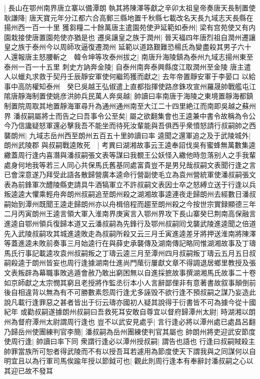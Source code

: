 |{
	長山在鄂州南界唐立寨以備潭朗}
執其將陳澤等獻之辛卯太祖皇帝奏唐天長制置使耿謙降|{
	唐天寶元年分江都六合高郵三縣地置千秋縣七載改名天長九域志天長縣在揚州西一百一十里}
獲芻糧二十餘萬唐主遣園苑使尹延範如泰州|{
	梁有宫苑使又有内園栽接使唐置園苑使亦猶是也}
遷吳讓皇之族于潤州|{
	晉天福四年唐烈祖自潤州遷讓皇之族于泰州今以周師攻逼復遷潤州}
延範以道路艱難恐楊氏為變盡殺其男子六十人還報唐主怒腰斬之　韓令坤等攻泰州拔之|{
	南唐升海陵鎮為泰州九域志揚州東至泰州一百一十五里}
刺史方訥奔金陵|{
	自泰州南奔泰興縣度江取潤州至金陵}
唐主遣人以蠟丸求救于契丹壬辰靜安軍使何繼筠獲而獻之|{
	去年帝置靜安軍于李晏口}
以給事中高防權知泰州　癸巳吳越王弘俶遣上直都指揮使路彦銖攻宣州羅晟帥戰艦屯江隂唐靜海制置使姚彦洪帥兵民萬人奔吳越|{
	帥讀曰率南唐于海陵之東境置靜海都鎮制置院周取其地置靜海軍尋升為通州通州南至大江二十四里絶江而南即吳越之蘇州界}
潘叔嗣屬將士而告之曰吾事令公至矣|{
	屬之欲翻集會也王逵兼中書令故稱為令公}
今乃信讒疑怒軍還必擊我吾不能坐而待死汝輩能與吾俱西乎衆憤怒請行叔嗣帥之西襲朗州|{
	九域志岳州西至朗州五百五十里帥讀曰率}
逵聞之還軍追之及于武陵城外|{
	朗州武陵郡}
與叔嗣戰逵敗死　|{
	考異曰湖湘故事云王逵奉詔伐吳有蜜蜂無萬數集逵繖蓋周行逢内喜潛與潘叔嗣張文表等謀曰我覩王公妖怪入繖他時忽落别人之手我輩處身何地我等若三人同心共保馬氏舊基同處富貴豈不是男兒哉叔嗣文表聞行逢之言已會深意遂乃拜受此語各散歸營廣本逵命行營副使毛立為袁州營統軍使潘叔嗣張文表為前鋒軍次醴陵縣吏請具牛酒犒軍立不許叔嗣文表因士卒之怒縛立送于行逢以兵叛逵逵大懼乘輕舟奔朗州叔嗣追至朗州殺之湖湘故事逵連夜走歸朗州去經數日潘叔嗣始到潭州既聞王逵走歸朗州亦以舟楫倍程而趨至朗州殺之今按世宗實録顯德三年二月丙寅朗州王逵言領大軍入淮南界庚寅言入鄂州界攻下長山寨癸巳荆南高保融言進逵自鄂州領兵復歸本道又云潘叔嗣為先鋒行及鄂州叔嗣囘戈襲武陵進逵聞之倍道先入武陵叔嗣攻其城進逵敗走為叔嗣所殺又云三月壬寅進逵差牙將押送淮南將陳澤等蓋進逵未敗前奏事三月始逵行在與薛史承襲傳及湖南傳記略同惟湖湘故事及丁璹馬氏行事記載逵攻袁州叔嗣叛之丁璹云逵三月至潭州四月叔嗣叛丁璹云五月五日叔嗣殺逵于朗州皆妄也周行逢據湖南仕進尚門䕃衍屢獻文章不得調退居鄉里教授及張文表叛辟為幕職事敗逃遁會赦乃敢出窮困無以自進採摭故事撰湖湘馬氏故事二十卷如京師獻之太宗憫其窮且老授將作監丞衍本小人言辭鄙俚非有意著書故叙事顛倒前後自相違背以無為有不可勝數素怨周行逢尤多誣毁不欲行逢不預叔嗣之謀乃妄造此說凡載行逢罪惡之甚者皆出于衍云璹亦國初人疑其說得于衍書皆不可為據今從十國紀年}
或勸叔嗣遂據朗州叔嗣曰吾救死耳安敢自尊宜以督府歸潭州太尉|{
	時湖湘以朗州為督府潭州太尉謂周行逢也}
豈不以武安見處乎|{
	言行逢必將以潭州處已處昌呂翻}
乃歸岳州使團練判官李簡|{
	潘叔嗣為岳州團練使判官其屬也}
帥朗州將吏迎武安節度使周行逢|{
	帥讀曰率下同}
衆謂行逢必以潭州授叔嗣|{
	謂告也語也}
行逢曰叔嗣賊殺主帥罪當族所可恕者得武陵而不有以授吾耳若遽用為節度使天下謂我與之同謀何以自明宜且以為行軍司馬俟踰年授以節鉞可也|{
	觀此則周行逢本有奉辭討潘叔嗣之心以其迎已故不發耳}
